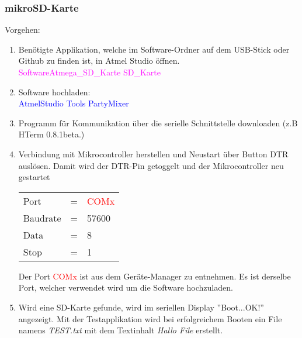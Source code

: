 \subsubsection{mikroSD-Karte}
\label{subsubsec:Inbetriebnahme_mikroSD_Karte}

Vorgehen:
\begin{enumerate}
\item Benötigte Applikation, welche im Software-Ordner auf dem USB-Stick oder Github \cite{aebi_projekt-6softwareatmega_2020} zu finden ist, in Atmel Studio öffnen.\\
\textcolor{magenta}{Software\textrightarrow Atmega\_SD\_Karte \textrightarrow SD\_Karte}\\

\item Software hochladen:\\
\textcolor{blue}{AtmelStudio \textrightarrow Tools \textrightarrow PartyMixer}\\

\item Programm für Kommunikation über die serielle Schnittstelle downloaden (z.B HTerm 0.8.1beta.)\cite{hammer_hterm_nodate}\\
\item Verbindung mit Mikrocontroller herstellen und Neustart über Button DTR auslösen. Damit wird der DTR-Pin getoggelt und der Mikrocontroller neu gestartet\\

\begin{table}[h!]
\center
\begin{tabular}{lcl}
Port & = & \textcolor{red}{COMx} \\
Baudrate & = & 57600 \\
Data & = & 8 \\
Stop & = & 1 \\
\end{tabular}
\end{table}

Der Port \textcolor{red}{COMx} ist aus dem Geräte-Manager zu entnehmen. Es ist derselbe Port, welcher verwendet wird um die Software hochzuladen.\\

\item Wird eine SD-Karte gefunde, wird im seriellen Display ''Boot...OK!'' angezeigt. Mit der Testapplikation wird bei erfolgreichem Booten ein File namens \textit{TEST.txt} mit dem Textinhalt \textit{Hallo File} erstellt.

\end{enumerate}
